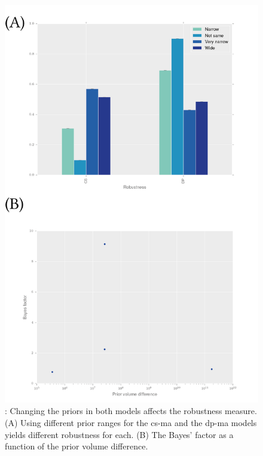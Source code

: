 \begin{figure}[h]
\begin{center}
\includegraphics[scale=0.8]{../../chapters/chapterStabilityFinder/images/priors_matter_2.png}
\caption[LoF caption]{ \label{fig:priors_matter2}: Changing the priors in both models affects the robustness measure. (A) Using different prior ranges for the \acrshort{cs-ma} and the \acrshort{dp-ma} models yields different robustness for each. (B) The Bayes' factor as a function of the prior volume difference. }
\end{center}
\end{figure}
\clearpage

